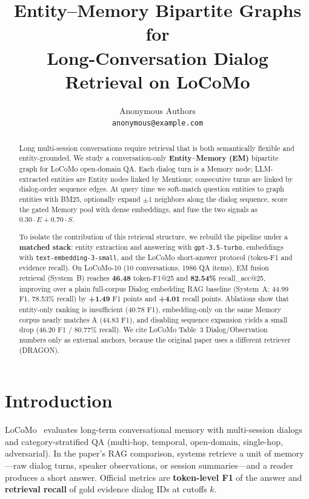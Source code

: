\documentclass[11pt]{article}
\title{Entity--Memory Bipartite Graphs for\\Long-Conversation Dialog Retrieval on LoCoMo}
\author{
  Anonymous Authors\\
  \texttt{anonymous@example.com}
}
\date{}
\begin{document}
\maketitle

\begin{abstract}
Long multi-session conversations require retrieval that is both semantically flexible and entity-grounded.
We study a conversation-only \textbf{Entity--Memory (EM)} bipartite graph for LoCoMo open-domain QA.
Each dialog turn is a Memory node; LLM-extracted entities are Entity nodes linked by Mentions; consecutive turns are linked by dialog-order sequence edges.
At query time we soft-match question entities to graph entities with BM25, optionally expand $\pm 1$ neighbors along the dialog sequence, score the gated Memory pool with dense embeddings, and fuse the two signals as $0.30\cdot E + 0.70\cdot S$.

To isolate the contribution of this retrieval structure, we rebuild the pipeline under a \textbf{matched stack}: entity extraction and answering with \texttt{gpt-3.5-turbo}, embeddings with \texttt{text-embedding-3-small}, and the LoCoMo short-answer protocol (token-F1 and evidence recall).
On LoCoMo-10 (10 conversations, 1986 QA items), EM fusion retrieval (System~B) reaches \textbf{46.48} token-F1@25 and \textbf{82.54\%} recall\_acc@25, improving over a plain full-corpus Dialog embedding RAG baseline (System~A: 44.99 F1, 78.53\% recall) by \textbf{+1.49} F1 points and \textbf{+4.01} recall points.
Ablations show that entity-only ranking is insufficient (40.78 F1), embedding-only on the same Memory corpus nearly matches A (44.83 F1), and disabling sequence expansion yields a small drop (46.20 F1 / 80.77\% recall).
We cite LoCoMo Table~3 Dialog/Observation numbers only as external anchors, because the original paper uses a different retriever (DRAGON).
\end{abstract}

\section{Introduction}
\label{sec:intro}

LoCoMo~\citep{maharana2024locomo} evaluates long-term conversational memory with multi-session dialogs and category-stratified QA (multi-hop, temporal, open-domain, single-hop, adversarial).
In the paper's RAG comparison, systems retrieve a unit of memory---raw dialog turns, speaker observations, or session summaries---and a reader produces a short answer.
Official metrics are \textbf{token-level F1} of the answer and \textbf{retrieval recall} of gold evidence dialog IDs at cutoffs $k$.
\end{document}
